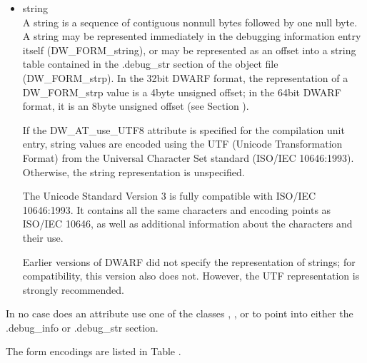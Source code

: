 \begin{itemize}
The use of compilation unit relative references will reduce the
number of link\dash time relocations and so speed up linking. The
use of the second and third type of reference allows for the
sharing of information, such as types, across compilation
units.

A reference to any kind of compilation unit identifies the
debugging information entry for that unit, not the preceding
header.

\item string \\
A string is a sequence of contiguous non\dash null bytes followed by
one null byte. A string may be represented immediately in the
debugging information entry itself (DW\-\_FORM\-\_string), or may
be represented as an offset into a string table contained in
the .debug\_str section of the object file (DW\-\_FORM\-\_strp). In
the 32\dash bit DWARF format, the representation of a DW\-\_FORM\-\_strp
value is a 4\dash byte unsigned offset; in the 64\dash bit DWARF format,
it is an 8\dash byte unsigned offset 
(see Section ).

If the DW\-\_AT\-\_use\-\_UTF8 attribute is specified for the
compilation unit entry, string values are encoded using the
UTF (Unicode Transformation Format) from the Universal
Character Set standard (ISO/IEC 10646:1993). Otherwise,
the string representation is unspecified.

The Unicode Standard Version 3 is fully compatible with
ISO/IEC 10646:1993. It contains all the same characters
and encoding points as ISO/IEC 10646, as well as additional
information about the characters and their use.

Earlier versions of DWARF did not specify the representation
of strings; for compatibility, this version also does
not. However, the UTF representation is strongly recommended.

\end{itemize}

In no case does an attribute use one of the classes ,
,  or  to point into either the
.debug\_info or .debug\_str section.

The form encodings are listed in 
Table .

